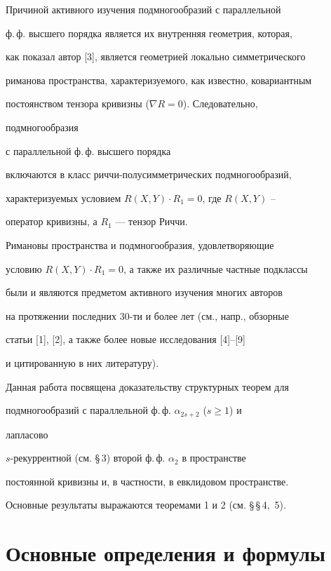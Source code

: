 Причиной активного изучения подмногообразий с параллельной


ф.\,ф. высшего порядка является их внутренняя геометрия, которая,


как показал автор [3], является геометрией локально симметрического


риманова пространства, характеризуемого, как известно, ковариантным


постоянством тензора кривизны ($\nabla R=0$). Следовательно,


подмногообразия


с параллельной ф.\,ф. высшего порядка


включаются в класс риччи-полусимметрических подмногообразий,


характеризуемых условием $R(X,Y)\cdot R_1=0$, где $R(X,Y)$ --


оператор кривизны, а $R_1$ --- тензор Риччи.





Римановы пространства и подмногообразия, удовлетворяющие


условию $R(X,Y)\cdot R_1=0$, а также их различные частные подклассы


были и являются предметом активного изучения многих авторов


на протяжении последних 30-ти и более лет (см., напр., обзорные


статьи [1], [2], а также более новые исследования [4]--[9]


и цитированную в них литературу).





Данная работа посвящена доказательству структурных теорем для


подмногообразий с параллельной ф.\,ф. $\alpha_{2s+2}$ ($s\ge 1$) и


лапласово


$s$-рекуррентной (см. \S\,3) второй ф.\,ф. $\alpha_2$ в пространстве


постоянной кривизны и, в частности, в евклидовом пространстве.


Основные результаты выражаются теоремами 1 и 2 (см. \S\,\S\,4,~5).





\section{Основные определения и формулы}





